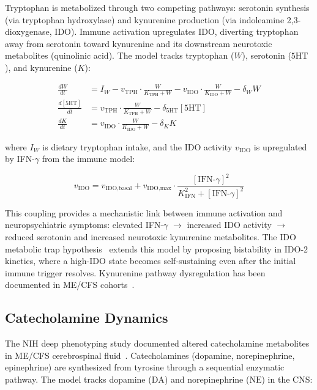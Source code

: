 Tryptophan is metabolized through two competing pathways: serotonin synthesis (via tryptophan hydroxylase) and kynurenine production (via indoleamine 2,3-dioxygenase, IDO). Immune activation upregulates IDO, diverting tryptophan away from serotonin toward kynurenine and its downstream neurotoxic metabolites (quinolinic acid). The model tracks tryptophan ($W$), serotonin ($5\text{HT}$), and kynurenine ($K$):

\begin{align}
\label{eq:tryptophan}
\frac{dW}{dt} &= I_W - v_{\text{TPH}} \cdot \frac{W}{K_{\text{TPH}} + W} - v_{\text{IDO}} \cdot \frac{W}{K_{\text{IDO}} + W} - \delta_W W \\
\frac{d[5\text{HT}]}{dt} &= v_{\text{TPH}} \cdot \frac{W}{K_{\text{TPH}} + W} - \delta_{5\text{HT}} [5\text{HT}] \\
\frac{dK}{dt} &= v_{\text{IDO}} \cdot \frac{W}{K_{\text{IDO}} + W} - \delta_K K
\end{align}

where $I_W$ is dietary tryptophan intake, and the IDO activity $v_{\text{IDO}}$ is upregulated by IFN-$\gamma$ from the immune model:

\begin{equation}
\label{eq:ido-regulation}
v_{\text{IDO}} = v_{\text{IDO,basal}} + v_{\text{IDO,max}} \cdot \frac{[\text{IFN-}\gamma]^2}{K_{\text{IFN}}^2 + [\text{IFN-}\gamma]^2}
\end{equation}

This coupling provides a mechanistic link between immune activation and neuropsychiatric symptoms: elevated IFN-$\gamma$ $\to$ increased IDO activity $\to$ reduced serotonin and increased neurotoxic kynurenine metabolites. The IDO metabolic trap hypothesis~\cite{phair2019ido} extends this model by proposing bistability in IDO-2 kinetics, where a high-IDO state becomes self-sustaining even after the initial immune trigger resolves. Kynurenine pathway dysregulation has been documented in ME/CFS cohorts~\cite{Kavyani2022kynurenine,Dehhaghi2022kynurenine}.

\subsection{Catecholamine Dynamics}

The NIH deep phenotyping study documented altered catecholamine metabolites in ME/CFS cerebrospinal fluid~\cite{walitt2024deep}. Catecholamines (dopamine, norepinephrine, epinephrine) are synthesized from tyrosine through a sequential enzymatic pathway. The model tracks dopamine ($\text{DA}$) and norepinephrine ($\text{NE}$) in the CNS:


